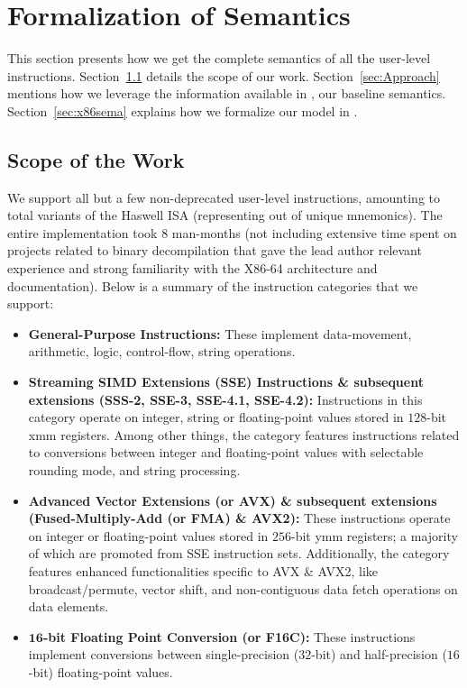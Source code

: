\section{Formalization of \ISA Semantics}
\label{sec:harvestsema}
This section presents how we get the complete semantics of all the
user-level instructions. Section~\ref{sec:IC} details the scope of our work. Section~\ref{sec:Approach} mentions how we leverage the information available in \Strata, our baseline semantics. Section~\ref{sec:x86sema} explains how we formalize our model in \K.

\subsection{Scope of the Work}\label{sec:IC}
We support all but a few non-deprecated user-level instructions, amounting to \currentIS{} total variants of the Haswell \ISA ISA (representing \currentIntel{} out of \totalIntel{} 
unique mnemonics). The entire implementation took 8 man-months (not including extensive time spent on projects related to binary decompilation that gave the lead author relevant experience and strong familiarity with the X86-64 architecture and documentation).  Below is a summary of the instruction categories that we support:
\begin{itemize}
    \item \textbf{General-Purpose Instructions:} These implement data-movement, arithmetic, logic, control-flow, string operations.
    
    \item \textbf{Streaming SIMD Extensions (SSE) Instructions \&   subsequent extensions (SSS-2, SSE-3, SSE-4.1, SSE-4.2):} Instructions in this category operate on integer, string or floating-point values stored in $128$-bit xmm registers. Among other things, the category features instructions related to conversions between integer and floating-point values with selectable rounding mode, and string processing.
    
    \item \textbf{Advanced Vector Extensions (or AVX) \& subsequent extensions (Fused-Multiply-Add (or FMA) \& AVX2):} These instructions operate on integer or floating-point values stored in $256$-bit ymm registers; a majority of which are promoted from SSE instruction sets. Additionally, the category features enhanced functionalities specific to AVX \& AVX2, like  broadcast/permute, vector shift, and non-contiguous data fetch operations on data elements. 
    \item \textbf{$\textbf{16}$-bit Floating Point Conversion (or F16C):} These instructions implement conversions between single-precision ($32$-bit) and half-precision ($16$-bit) floating-point values. 
\end{itemize}

